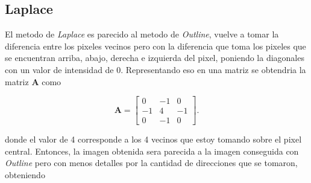 \subsection{Laplace}

El metodo de \textit{Laplace} es parecido al metodo de \textit{Outline}, vuelve a tomar la diferencia entre los pixeles vecinos pero con la diferencia que toma los pixeles que se encuentran arriba, abajo, derecha e izquierda del pixel, poniendo la diagonales con un valor de intensidad de 0. Representando eso en una matriz se obtendria la matriz \textbf{A} como


\begin{equation}
\textbf{A}=\begin{bmatrix}
0 &-1 &0\\
-1 &4 &-1\\
0 &-1 &0
\end{bmatrix}.
\end{equation}

donde el valor de 4 corresponde a los 4 vecinos que estoy tomando sobre el pixel central. Entonces, la imagen obtenida sera parecida a la imagen conseguida con \textit{Outline} pero con menos detalles por la cantidad de direcciones que se tomaron, obteniendo 


